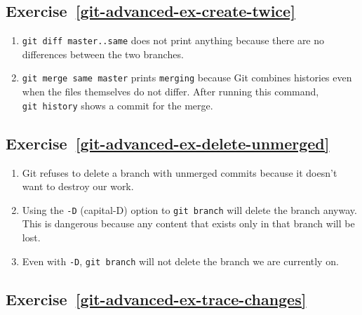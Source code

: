 \documentclass[
]{krantz}
\begin{document}
\hypertarget{exercise-refgit-advanced-ex-create-twice}{%
\subsection*{Exercise~\ref{git-advanced-ex-create-twice}}\label{exercise-refgit-advanced-ex-create-twice}}


\begin{enumerate}
\def\labelenumi{\arabic{enumi}.}
\item
  \texttt{git\ diff\ master..same} does not print anything
  because there are no differences between the two branches.
\item
  \texttt{git\ merge\ same\ master} prints \texttt{merging}
  because Git combines histories even when the files themselves do not differ.
  After running this command,
  \texttt{git\ history} shows a commit for the merge.
\end{enumerate}

\hypertarget{exercise-refgit-advanced-ex-delete-unmerged}{%
\subsection*{Exercise~\ref{git-advanced-ex-delete-unmerged}}\label{exercise-refgit-advanced-ex-delete-unmerged}}


\begin{enumerate}
\def\labelenumi{\arabic{enumi}.}
\item
  Git refuses to delete a branch with unmerged commits
  because it doesn't want to destroy our work.
\item
  Using the \texttt{-D} (capital-D) option to \texttt{git\ branch} will delete the branch anyway.
  This is dangerous because any content that exists only in that branch will be lost.
\item
  Even with \texttt{-D}, \texttt{git\ branch} will not delete the branch we are currently on.
\end{enumerate}

\hypertarget{exercise-refgit-advanced-ex-trace-changes}{%
\subsection*{Exercise~\ref{git-advanced-ex-trace-changes}}\label{exercise-refgit-advanced-ex-trace-changes}}
\end{document}
